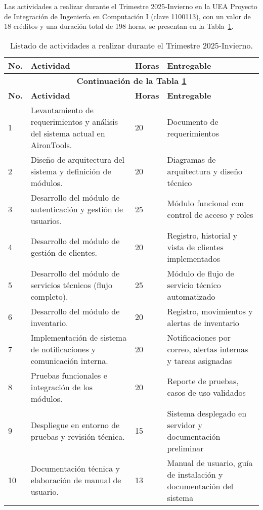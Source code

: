 Las actividades a realizar durante el Trimestre 2025-Invierno en la UEA Proyecto de Integración de Ingeniería en Computación I (clave 1100113), con un valor de 18 créditos y una duración total de 198 horas, se presentan en la Tabla~\ref{table:calendarioActividades}.

\begin{longtable}{p{} p{} p{} p{}}
	\caption{Listado de actividades a realizar durante el Trimestre 2025-Invierno.}
  	\label{table:calendarioActividades}\\
	\toprule
	\textbf{No.} & \textbf{Actividad} & \textbf{Horas} & \textbf{Entregable} \\
	\hline
	\endfirsthead

	\multicolumn{4}{c}{\textbf{Continuación de la Tabla \ref{table:calendarioActividades}}}\\
	\hline
	\textbf{No.} & \textbf{Actividad} & \textbf{Horas} & \textbf{Entregable} \\
	\hline
	\endhead

	\hline
	\endlastfoot

	1 & Levantamiento de requerimientos y análisis del sistema actual en AironTools. & 20 & Documento de requerimientos \\
	\midrule

	2 & Diseño de arquitectura del sistema y definición de módulos. & 20 & Diagramas de arquitectura y diseño técnico \\
	\midrule

	3 & Desarrollo del módulo de autenticación y gestión de usuarios. & 25 & Módulo funcional con control de acceso y roles \\
	\midrule

	4 & Desarrollo del módulo de gestión de clientes. & 20 & Registro, historial y vista de clientes implementados \\
	\midrule

	5 & Desarrollo del módulo de servicios técnicos (flujo completo). & 25 & Módulo de flujo de servicio técnico automatizado \\
	\midrule

	6 & Desarrollo del módulo de inventario. & 20 & Registro, movimientos y alertas de inventario \\
	\midrule

	7 & Implementación de sistema de notificaciones y comunicación interna. & 20 & Notificaciones por correo, alertas internas y tareas asignadas \\
	\midrule

	8 & Pruebas funcionales e integración de los módulos. & 20 & Reporte de pruebas, casos de uso validados \\
	\midrule

	9 & Despliegue en entorno de pruebas y revisión técnica. & 15 & Sistema desplegado en servidor y documentación preliminar \\
	\midrule

	10 & Documentación técnica y elaboración de manual de usuario. & 13 & Manual de usuario, guía de instalación y documentación del sistema \\
	\bottomrule
\end{longtable}

